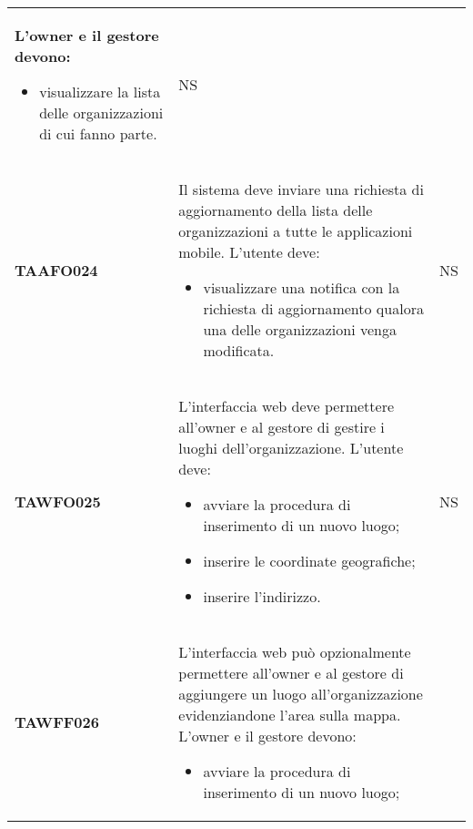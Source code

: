 \documentclass[../piano-di-qualifica.tex]{subfiles}
\begin{document}
\begin{longtable}[H]{>{\centering\bfseries}m{3cm} >{}m{11cm} >{\centering\arraybackslash}m{2cm}}
  L’owner e il gestore devono:
  \begin{itemize}
    \item visualizzare la lista delle organizzazioni di cui fanno parte.
  \end{itemize}
                                  & NS                                                                                                                                                                                                                                   \\
  TAAFO024                        & Il sistema deve inviare una richiesta di aggiornamento della lista delle organizzazioni a tutte le applicazioni mobile.         \newline
  L’utente deve:
  \begin{itemize}
    \item visualizzare una notifica con la richiesta di aggiornamento qualora una delle organizzazioni venga modificata.
  \end{itemize}
                                  & NS                                                                                                                                                                                                                                   \\
  TAWFO025                        & L’interfaccia web deve permettere all’owner e al gestore di gestire i luoghi dell’organizzazione.         \newline
  L’utente deve:
  \begin{itemize}
    \item avviare la procedura di inserimento di un nuovo luogo;
    \item inserire le coordinate geografiche;
    \item inserire l'indirizzo.
  \end{itemize}
                                  & NS                                                                                                                                                                                                                                   \\
  TAWFF026                        & L’interfaccia web può opzionalmente permettere all’owner e al gestore di aggiungere un luogo all’organizzazione evidenziandone l’area sulla mappa. \newline
  L’owner e il gestore devono:
  \begin{itemize}
    \item avviare la procedura di inserimento di un nuovo luogo;

\end{itemize}
\end{longtable}
\end{document}
